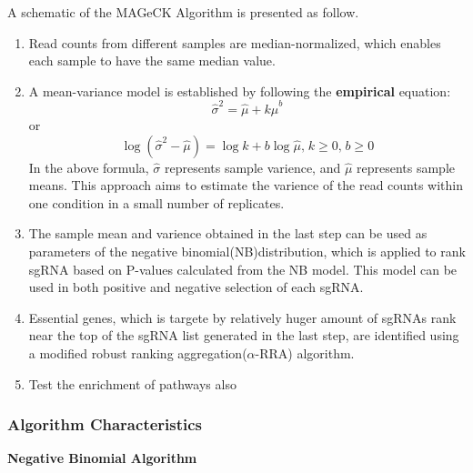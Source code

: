 \documentclass[fleqn,10pt]{wlscirep}
\begin{document}
A schematic of the MAGeCK Algorithm is presented as follow\cite{li2014mageck}.
\begin{enumerate}
    \item Read counts from different samples are median-normalized, which enables each sample to have the same median value.
    \item A mean-variance model is established by following the \textbf{empirical} equation:
        \begin{equation}
           \hat{\sigma}^2=\hat{\mu}+k\hat{\mu}^b
        \end{equation}
        or
        \begin{equation}
            \log{(\hat{\sigma}^2-\hat{\mu})}=\log{k}+b\log{\hat{\mu}}\textrm{,}\; k\geqslant{0} \textrm{,}\;b\geqslant{0}
         \end{equation}
        In the above formula, $\hat{\sigma}$ represents sample varience, and $\hat{\mu}$ represents sample means.  This approach aims to estimate the varience of the read counts within one condition in a small number of replicates.
    \item The sample mean and varience obtained in the last step can be used as parameters of the negative binomial(NB)distribution, which is applied to rank sgRNA based on P-values calculated from the NB model.  This model can be used in both positive and negative selection of each sgRNA.
    \item Essential genes, which is targete by relatively huger amount of sgRNAs rank near the top of the sgRNA list generated in the last step, are identified using a modified robust ranking aggregation($\alpha$-RRA) algorithm.
    \item Test the enrichment of pathways also 
    \end{enumerate}

\subsubsection*{Algorithm Characteristics}
\textbf{Negative Binomial Algorithm}
\end{document}

